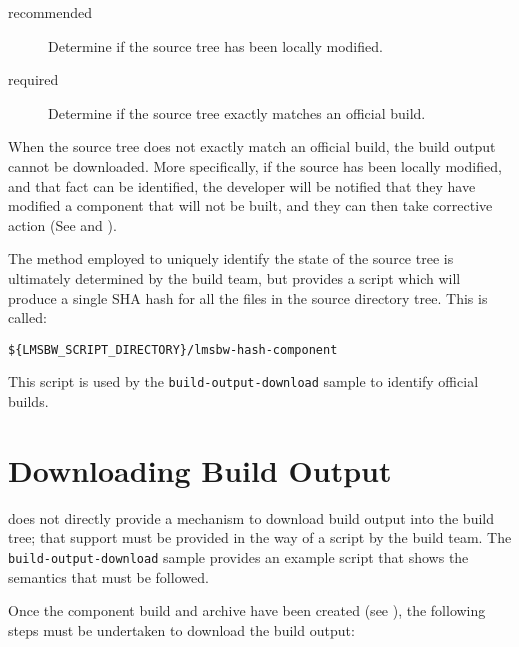   \begin{description}
  \item[recommended] Determine if the source tree has been
    locally modified.

  \item[required] Determine if the source tree exactly matches an
    official build.
  \end{description}

When the source tree does not exactly match an official build, the
build output cannot be downloaded.  More specifically, if the source
has been locally modified, and that fact can be identified, the
developer will be notified that they have modified a component that
will not be built, and they can then take corrective action (See
 and
).

The method employed to uniquely identify the state of the source tree
is ultimately determined by the build team, but \lmsbw provides a
script which will produce a single SHA hash for all the files in the
source directory tree.  This is called:

\begin{verbatim}
${LMSBW_SCRIPT_DIRECTORY}/lmsbw-hash-component
\end{verbatim}

This script is used by the \texttt{build-output-download} sample to
identify official builds.

\section{Downloading Build Output}
\label{tips:build-output-download-script}

\lmsbw does not directly provide a mechanism to download build output
into the build tree; that support must be provided in the way of a
script by the build team.  The \texttt{build-output-download} sample
provides an example script that shows the semantics that must be
followed.

Once the component build and archive have been created (see
), the following steps must be
undertaken to download the build output:

